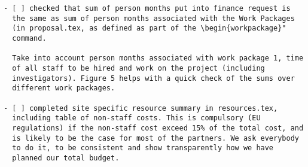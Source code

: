 \begin{draft}
\vspace{1cm}

\begin{verbatim}
- [ ] checked that sum of person months put into finance request is
  the same as sum of person months associated with the Work Packages
  (in proposal.tex, as defined as part of the \begin{workpackage}"
  command.
  
  Take into account person months associated with work package 1, time
  of all staff to be hired and work on the project (including
  investigators). Figure 5 helps with a quick check of the sums over
  different work packages.

- [ ] completed site specific resource summary in resources.tex,
  including table of non-staff costs. This is compulsory (EU
  regulations) if the non-staff cost exceed 15% of the total cost, and
  is likely to be the case for most of the partners. We ask everybody
  to do it, to be consistent and show transparently how we have
  planned our total budget.
\end{verbatim}
\end{draft}





